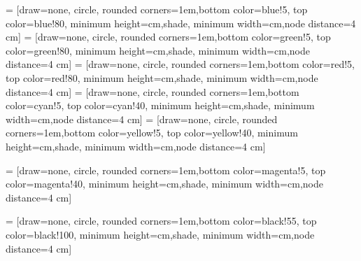  = [draw=none, circle, rounded corners=1em,bottom color=blue!5, top color=blue!80,
    minimum height=\R*\overlap cm,shade, minimum width=\R*\overlap cm,node distance=4 cm]
     = [draw=none, circle, rounded corners=1em,bottom color=green!5, top color=green!80,
    minimum height=\R*\overlap cm,shade, minimum width=\R*\overlap cm,node distance=4 cm]
     = [draw=none, circle, rounded corners=1em,bottom color=red!5, top color=red!80,
    minimum height=\R*\overlap cm,shade, minimum width=\R*\overlap cm,node distance=4 cm]
         = [draw=none, circle, rounded corners=1em,bottom color=cyan!5, top color=cyan!40,
    minimum height=\R*\overlap cm,shade, minimum width=\R*\overlap cm,node distance=4 cm]
     = [draw=none, circle, rounded corners=1em,bottom color=yellow!5, top color=yellow!40,
    minimum height=\R*\overlap cm,shade, minimum width=\R*\overlap cm,node distance=4 cm]
    
     = [draw=none, circle, rounded corners=1em,bottom color=magenta!5, top color=magenta!40,
    minimum height=\R*\overlap cm,shade, minimum width=\R*\overlap cm,node distance=4 cm]
    
         = [draw=none, circle, rounded corners=1em,bottom color=black!55, top color=black!100,
    minimum height=\R*\overlap cm,shade, minimum width=\R*\overlap cm,node distance=4 cm]
    
